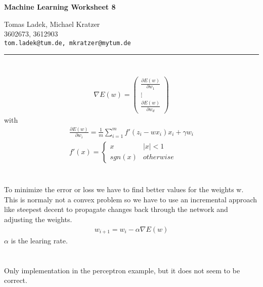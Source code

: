 \documentclass[11pt]{article}
\makeatletter
\newcommand{\exercise}{\section{}}
\newcommand{\hwhead}[4]{
\begin{center}
\sffamily\large\bfseries Machine Learning Worksheet #1
\vspace{2mm}
\normalfont

#2\\
#3\\
\texttt{#4}
\end{center}
\vspace{6mm} \hrule \vspace{4mm}
}
\newcommand{\names}{Tomas Ladek, Michael Kratzer} %
\newcommand{\imats}{3602673, 3612903} %
\newcommand{\emails}{tom.ladek@tum.de, mkratzer@mytum.de} %
\makeatother
\begin{document}
\hwhead{8}{\names}{\imats}{\emails}


\exercise
\begin{align*}
	\nabla E(w) = \begin{pmatrix}
		\frac{\partial E(w)}{\partial w_1} \\
		\vdots \\
		\frac{\partial E(w)}{\partial w_d}
	\end{pmatrix}
\end{align*}
with
\begin{align*}
	\frac{\partial E(w)}{\partial w_i} = \frac{1}{m}\sum_{i=1}^{m}f'(z_i -wx_i)x_i + \gamma w_i \\
	f'(x) = \begin{cases}
		x  & |x|<1 \\
		sgn(x) & otherwise
	\end{cases}
\end{align*}

\exercise
To minimize the error or loss we have to find better values for the weights w. This is normaly not a convex problem so we have to use an incremental approach like steepest decent to propagate changes back through the network and adjusting the weights.
\begin{align}
	w_{i+1} = w_i - \alpha \nabla E(w)
\end{align}
$\alpha$ is the learing rate.

\exercise
Only implementation in the perceptron example, but it does not seem to be correct.

\end{document}
